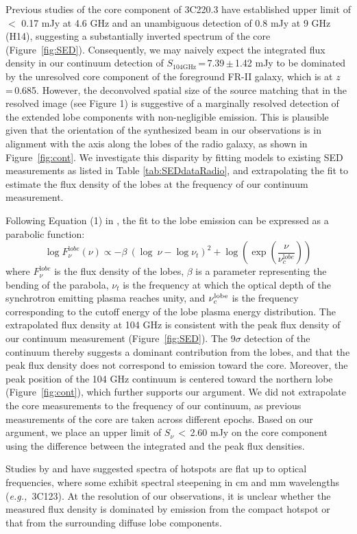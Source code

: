 \documentclass[twocolumn,apj,numberedappendix]{emulateapj}
\newcommand{\eg}{{\sl e.g.,~}}
\begin{document}
Previous studies of the core component of 3C220.3 have established upper
limit of $<$ 0.17 mJy at 4.6 GHz \citep{Mullin06a} and an unambiguous detection of 0.8 mJy at 9 GHz (H14), suggesting a substantially inverted spectrum of the core (Figure~\ref{fig:SED}).
Consequently, we may naively expect the integrated flux density in our continuum detection of $S_\textrm{104GHz}$\,=\,7.39\,$\pm$\,1.42\,\,mJy to be dominated by the unresolved core component of the foreground FR-II galaxy, which is at $z$\,=\,0.685.
However, the deconvolved spatial size of the source matching that in the resolved image (see Figure 1) is
suggestive of a marginally resolved detection of the extended lobe components with non-negligible emission.
This is plausible given that the orientation of the synthesized beam in our observations is in alignment with the
axis along the
lobes of the radio galaxy, as shown in Figure~\ref{fig:cont}. We investigate this disparity by fitting models to
existing SED measurements as listed in Table \ref{tab:SEDdataRadio}, and extrapolating the fit to
estimate the flux density of the lobes at the frequency of our continuum measurement.

Following Equation (1) in \citet{Cleary07a}, the fit to the lobe emission can be expressed as a parabolic function:
\begin{equation}
\log F_{\nu}^{\mathrm lobe} (\nu) \propto - \beta\ (\log\ \nu - \log \nu_{t})^2  + \log (\exp({\frac{\nu}{\nu_c^{\mathrm lobe}}}))
\end{equation}
where $F_{\nu}^{\mathrm lobe}$ is the flux density of the lobes, $\beta$ is a parameter representing the bending
of the parabola, $\nu_t$ is the frequency at which the optical depth of the synchrotron emitting plasma reaches
unity, and $\nu_c^{\rm lobe}$ is the frequency corresponding to the cutoff energy of the lobe plasma energy
distribution.
The extrapolated flux density at 104\,\,GHz is consistent with the peak flux density of our continuum
measurement (Figure~\ref{fig:SED}). The 9$\sigma$ detection of the continuum thereby suggests a
dominant contribution from the lobes, and that the peak flux density does not correspond to emission toward
the core. Moreover, the peak position of the 104\,\,GHz continuum is
centered toward the northern lobe (Figure~\ref{fig:cont}), which further supports our argument. We did not
extrapolate the core measurements to the frequency of our continuum, as previous measurements of the core are
taken
across different epochs.
Based on our argument, we place an upper limit of $S_\nu$\,$<$\,2.60 mJy on the core component using the difference between the integrated and the peak flux densities.
\par
Studies by \citet{Meisenheimer89a} and \citet{Hardcastle08a} have suggested spectra of hotspots are flat up to optical frequencies, where some exhibit spectral steepening in cm and mm wavelengths (\eg 3C123). At the resolution of our observations, it is unclear whether the measured flux density is dominated by emission from the compact hotspot or that from the surrounding diffuse lobe components.
\end{document}
